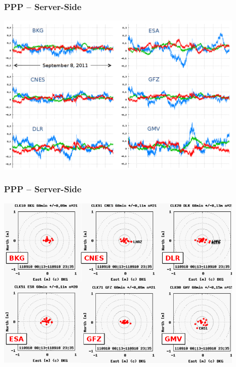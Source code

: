 \documentclass[10pt]{beamer}
\begin{document}

\begin{frame}
\frametitle{PPP -- Server-Side}
  \begin{center}
    \includegraphics[width=0.9\textwidth,angle=0]{ac_results.png}
  \end{center}
\end{frame}


\begin{frame}
\frametitle{PPP -- Server-Side}
  \begin{center}
    \includegraphics[width=0.9\textwidth,angle=0]{ac_results2.png}
  \end{center}
\end{frame}

\end{document}
